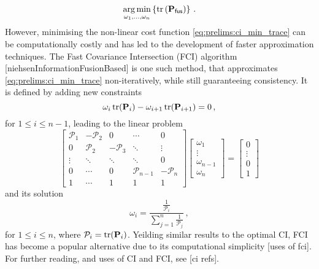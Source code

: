 \begin{equation}\label{eq:prelims:ci_min_trace}
    \operatorname*{arg\,min}_{\omega_1,\dots,\omega_n} \left\{\operatorname{tr}\left({{\mathbf{P}}}_{\mathsf{fus}}\right)\right\}\,.
 \end{equation}
However, minimising the non-linear cost function \eqref{eq:prelims:ci_min_trace} can be computationally costly and has led to the development of faster approximation techniques. The Fast Covariance Intersection (FCI) algorithm [niehsenInformationFusionBased] is one such method, that approximates \eqref{eq:prelims:ci_min_trace} non-iteratively, while still guaranteeing consistency. It is defined by adding new constraints
\begin{equation}\label{eq:prelims:fci_added_constraints}
   \omega_i \operatorname{tr}({{\mathbf{P}}}_i) - \omega_{i+1} \operatorname{tr}({{\mathbf{P}}}_{i+1}) = 0\,,
\end{equation}
for $1\leq i\leq n-1$, leading to the linear problem
\begin{equation}\label{eq:prelims:fci_matrix_equation}
    \begin{bmatrix}
        \mathcal{P}_1 & -\mathcal{P}_2 & 0 & \cdots & 0 \\
        0 & \mathcal{P}_2 & -\mathcal{P}_3 & \ddots & \vdots \\
        \vdots & \ddots & \ddots & \ddots & 0 \\
        0 & \cdots & 0 & \mathcal{P}_{n-1} & -\mathcal{P}_n \\
        1 & \cdots & 1 & 1 & 1
    \end{bmatrix}
    \begin{bmatrix}
        \omega_1 \\
        \vdots \\
        \omega_{n-1} \\
        \omega_n
    \end{bmatrix}
    =
    \begin{bmatrix}
        0 \\
        \vdots \\
        0 \\
        1
    \end{bmatrix}
\end{equation}
and its solution
\begin{equation}\label{eq:prelims:fci_solution}
    \omega_i = \frac{\frac{1}{\mathcal{P}_i}}{\sum_{j=1}^n \frac{1}{\mathcal{P}_j}}\,,
\end{equation}
for $1\leq i\leq n$, where $\mathcal{P}_i = \operatorname{tr}({{\mathbf{P}}}_i)$. Yeilding similar results to the optimal CI, FCI has become a popular alternative due to its computational simplicity [uses of fci]. For further reading, and uses of CI and FCI, see [ci refs].

